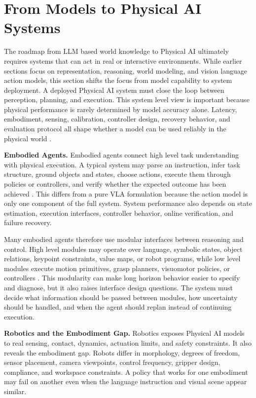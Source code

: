\section{From Models to Physical AI Systems}
\label{sec:systems}

The roadmap from LLM based world knowledge to Physical AI ultimately requires systems that can act in real or interactive environments. 
While earlier sections focus on representation, reasoning, world modeling, and vision language action models, this section shifts the focus from model capability to system deployment. 
A deployed Physical AI system must close the loop between perception, planning, and execution. 
This system level view is important because physical performance is rarely determined by model accuracy alone. 
Latency, embodiment, sensing, calibration, controller design, recovery behavior, and evaluation protocol all shape whether a model can be used reliably in the physical world \citep{guo2026agenticlab,team2025gemini1,team2025gemini15,brohan2023rt,o2024open}.

\noindent\textbf{Embodied Agents.}
Embodied agents connect high level task understanding with physical execution. 
A typical system may parse an instruction, infer task structure, ground objects and states, choose actions, execute them through policies or controllers, and verify whether the expected outcome has been achieved \citep{guo2026agenticlab,ahn2022saycan,liu2024ok}. 
This differs from a pure VLA formulation because the action model is only one component of the full system. 
System performance also depends on state estimation, execution interfaces, controller behavior, online verification, and failure recovery.

Many embodied agents therefore use modular interfaces between reasoning and control. 
High level modules may operate over language, symbolic states, object relations, keypoint constraints, value maps, or robot programs, while low level modules execute motion primitives, grasp planners, visuomotor policies, or controllers \citep{huang2025rekep,huang2023voxposer,liang2023codeaspolicies,shen2026tiptop}. 
This modularity can make long horizon behavior easier to specify and diagnose, but it also raises interface design questions. 
The system must decide what information should be passed between modules, how uncertainty should be handled, and when the agent should replan instead of continuing execution.

\noindent\textbf{Robotics and the Embodiment Gap.}
Robotics exposes Physical AI models to real sensing, contact, dynamics, actuation limits, and safety constraints. 
It also reveals the embodiment gap. 
Robots differ in morphology, degrees of freedom, sensor placement, camera viewpoints, control frequency, gripper design, compliance, and workspace constraints. 
A policy that works for one embodiment may fail on another even when the language instruction and visual scene appear similar.

